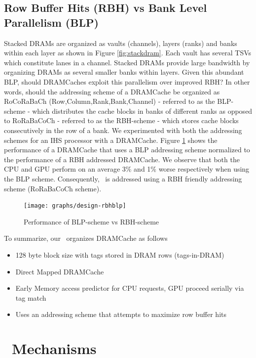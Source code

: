 \subsection{Row Buffer Hits (RBH) vs Bank Level Parallelism (BLP)} 

Stacked DRAMs are organized as vaults (channels), layers (ranks) and banks within each layer as shown in Figure \ref{fig:stackdram}. Each vault has several TSVs which constitute lanes in a channel. Stacked DRAMs provide large bandwidth by organizing DRAMs as several smaller banks within layers. Given this abundant BLP, should DRAMCaches exploit this parallelism over improved RBH? In other words, should the addressing scheme of a DRAMCache be organized as RoCoRaBaCh (Row,Column,Rank,Bank,Channel) - referred to as the BLP-scheme - which distributes the cache blocks in banks of different ranks as opposed to RoRaBaCoCh - referred to as the RBH-scheme - which stores cache blocks consecutively in the row of a bank. We experimented with both the addressing schemes for an IHS processor with a DRAMCache. Figure \ref{fig:design-rbhblp} shows the performance of a DRAMCache that uses a BLP addressing scheme normalized to the performance of a RBH addressed DRAMCache. We observe that both the CPU and GPU perform on an average 3\% and 1\% worse respectively when using the BLP scheme. Consequently, \cachename\ is addressed using a RBH friendly addressing scheme (RoRaBaCoCh scheme). 

\begin{figure}[!htb]
	\centering
	\texttt{[image: graphs/design-rbhblp]}
	\caption{Performance of BLP-scheme vs RBH-scheme}
	\label{fig:design-rbhblp}
\end{figure}

\par To summarize, our \cachename\ organizes DRAMCache as follows
\begin{itemize}
	\setlength\itemsep{0.5em}
	\item 128 byte block size with tags stored in DRAM rows (tags-in-DRAM)
	\item Direct Mapped DRAMCache
	\item Early Memory access predictor for CPU requests, GPU proceed serially via tag match
	\item Uses an addressing scheme that attempts to maximize row buffer hits
\end{itemize}


\section{\cachename\ Mechanisms}

